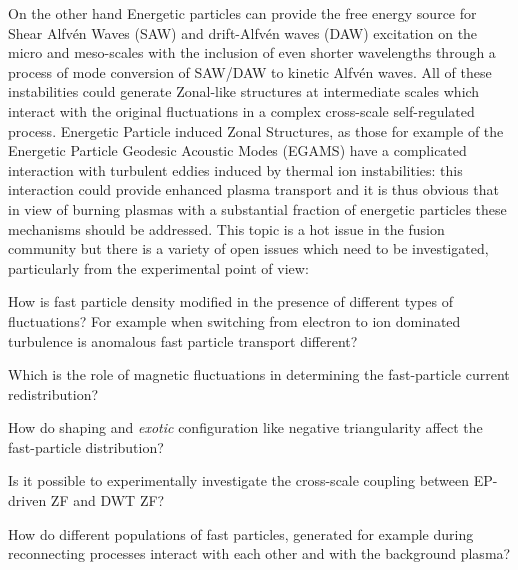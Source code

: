 \documentclass[12pt,a4paper]{article}
\begin{document}
On the other hand Energetic
particles can provide the free energy source for Shear Alfv{\'e}n
Waves (SAW) and drift-Alfv{\'e}n waves (DAW) excitation on the micro and
meso-scales \cite{Zonca:2015hs} with the inclusion of even shorter
wavelengths through a process of mode conversion of SAW/DAW to kinetic
Alfv{\'e}n waves. All of these instabilities could generate Zonal-like
structures at intermediate scales which interact with the original
fluctuations in a complex cross-scale self-regulated process. 
Energetic Particle induced Zonal Structures, as those for
example of the Energetic Particle Geodesic Acoustic Modes (EGAMS)
\cite{Zarzoso:2013kw,Nazikian:2008hk,Ido:2011gy} have a complicated
interaction with turbulent eddies induced by thermal ion
instabilities: this interaction could provide enhanced plasma transport
and it is thus obvious that in view of burning plasmas with a
substantial fraction of energetic particles these mechanisms should be
addressed. This topic is a hot issue in the fusion community but
there is a variety of open issues which need to be investigated,
particularly from the experimental point of view:
\begin{description}[labelindent=0pt, labelsep*=0.3em, leftmargin=!, itemsep=0.02ex]
\item[(i)] How is fast particle density modified in the presence of
  different types of fluctuations? For example when switching from electron to
  ion dominated turbulence is anomalous fast particle transport different?
\item[(ii)] Which is the role of magnetic fluctuations in determining
  the fast-particle current redistribution?
\item[(iii)] How do shaping and \emph{exotic} configuration like negative
  triangularity affect the fast-particle distribution?
\item[(iv)] Is it possible to experimentally investigate the
  cross-scale coupling between EP-driven ZF and DWT ZF?
\item[(v)] How do different populations of fast particles, generated for
  example during reconnecting processes interact with each other and
  with the background plasma?
\end{description}
\end{document}
